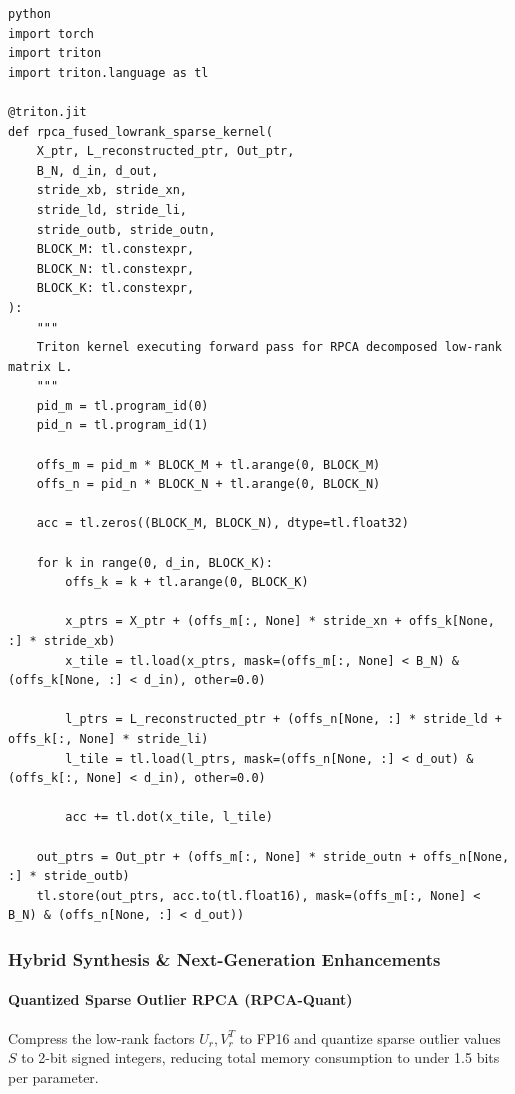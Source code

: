 \vspace{0.5em}
\begin{mdframed}[backgroundcolor=codebg, linecolor=codeframe, linewidth=1pt, roundcorner=4pt, innerleftmargin=2pt, innerrightmargin=5pt, innertopmargin=5pt, innerbottommargin=5pt]
\begin{lstlisting}
python
import torch
import triton
import triton.language as tl

@triton.jit
def rpca_fused_lowrank_sparse_kernel(
    X_ptr, L_reconstructed_ptr, Out_ptr,
    B_N, d_in, d_out,
    stride_xb, stride_xn,
    stride_ld, stride_li,
    stride_outb, stride_outn,
    BLOCK_M: tl.constexpr,
    BLOCK_N: tl.constexpr,
    BLOCK_K: tl.constexpr,
):
    """
    Triton kernel executing forward pass for RPCA decomposed low-rank matrix L.
    """
    pid_m = tl.program_id(0)
    pid_n = tl.program_id(1)

    offs_m = pid_m * BLOCK_M + tl.arange(0, BLOCK_M)
    offs_n = pid_n * BLOCK_N + tl.arange(0, BLOCK_N)

    acc = tl.zeros((BLOCK_M, BLOCK_N), dtype=tl.float32)

    for k in range(0, d_in, BLOCK_K):
        offs_k = k + tl.arange(0, BLOCK_K)

        x_ptrs = X_ptr + (offs_m[:, None] * stride_xn + offs_k[None, :] * stride_xb)
        x_tile = tl.load(x_ptrs, mask=(offs_m[:, None] < B_N) & (offs_k[None, :] < d_in), other=0.0)

        l_ptrs = L_reconstructed_ptr + (offs_n[None, :] * stride_ld + offs_k[:, None] * stride_li)
        l_tile = tl.load(l_ptrs, mask=(offs_n[None, :] < d_out) & (offs_k[:, None] < d_in), other=0.0)

        acc += tl.dot(x_tile, l_tile)

    out_ptrs = Out_ptr + (offs_m[:, None] * stride_outn + offs_n[None, :] * stride_outb)
    tl.store(out_ptrs, acc.to(tl.float16), mask=(offs_m[:, None] < B_N) & (offs_n[None, :] < d_out))
\end{lstlisting}
\end{mdframed}
\vspace{0.5em}


\subsubsection*{Hybrid Synthesis \& Next-Generation Enhancements}

\paragraph{Quantized Sparse Outlier RPCA (RPCA-Quant)}
Compress the low-rank factors $U_r, V_r^T$ to FP16 and quantize sparse outlier values $S$ to 2-bit signed integers, reducing total memory consumption to under 1.5 bits per parameter.

